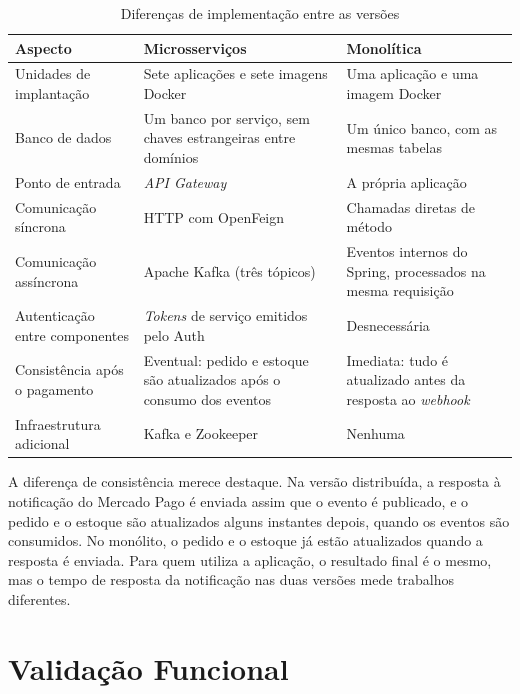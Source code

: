 \begin{table}[htbp]
\centering
\caption{Diferenças de implementação entre as versões}
\label{tab:diferencas}
\small
\begin{tabular}{|>{\raggedright\arraybackslash}p{3.4cm}|>{\raggedright\arraybackslash}p{5.6cm}|>{\raggedright\arraybackslash}p{5.6cm}|}
\hline
\textbf{Aspecto} & \textbf{Microsserviços} & \textbf{Monolítica} \\ \hline
Unidades de implantação & Sete aplicações e sete imagens Docker & Uma aplicação e uma imagem Docker \\ \hline
Banco de dados & Um banco por serviço, sem chaves estrangeiras entre domínios & Um único banco, com as mesmas tabelas \\ \hline
Ponto de entrada & \textit{API Gateway} & A própria aplicação \\ \hline
Comunicação síncrona & HTTP com OpenFeign & Chamadas diretas de método \\ \hline
Comunicação assíncrona & Apache Kafka (três tópicos) & Eventos internos do Spring, processados na mesma requisição \\ \hline
Autenticação entre componentes & \textit{Tokens} de serviço emitidos pelo Auth & Desnecessária \\ \hline
Consistência após o pagamento & Eventual: pedido e estoque são atualizados após o consumo dos eventos & Imediata: tudo é atualizado antes da resposta ao \textit{webhook} \\ \hline
Infraestrutura adicional & Kafka e Zookeeper & Nenhuma \\ \hline
\end{tabular}
\par\vspace{4pt}{\footnotesize Fonte: Elaborada pelo autor (2026).}
\end{table}

A diferença de consistência merece destaque. Na versão distribuída, a resposta à notificação do
Mercado Pago é enviada assim que o evento é publicado, e o pedido e o estoque são atualizados
alguns instantes depois, quando os eventos são consumidos. No monólito, o pedido e o estoque já
estão atualizados quando a resposta é enviada. Para quem utiliza a aplicação, o resultado final
é o mesmo, mas o tempo de resposta da notificação nas duas versões mede trabalhos diferentes.

\section{Validação Funcional}

